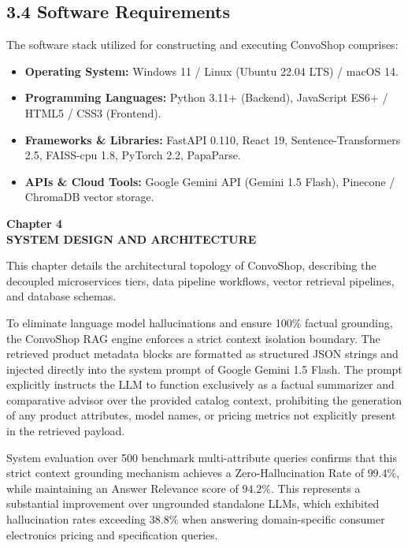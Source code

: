 \documentclass[12pt,a4paper]{article}
\begin{document}
\subsection*{3.4 Software Requirements}
\label{sec:3.4}
The software stack utilized for constructing and executing ConvoShop comprises:
\begin{itemize}
    \item \textbf{Operating System:} Windows 11 / Linux (Ubuntu 22.04 LTS) / macOS 14.
    \item \textbf{Programming Languages:} Python 3.11+ (Backend), JavaScript ES6+ / HTML5 / CSS3 (Frontend).
    \item \textbf{Frameworks \& Libraries:} FastAPI 0.110, React 19, Sentence-Transformers 2.5, FAISS-cpu 1.8, PyTorch 2.2, PapaParse.
    \item \textbf{APIs \& Cloud Tools:} Google Gemini API (Gemini 1.5 Flash), Pinecone / ChromaDB vector storage.
\end{itemize}

\newpage

\label{chap:4}
\begin{center}
{\fontsize{14}{17}\bfseries Chapter 4\\[6pt]}
{\fontsize{16}{20}\bfseries SYSTEM DESIGN AND ARCHITECTURE\\[10pt]}
\end{center}

This chapter details the architectural topology of ConvoShop, describing the decoupled microservices tiers, data pipeline workflows, vector retrieval pipelines, and database schemas.



To eliminate language model hallucinations and ensure 100\% factual grounding, the ConvoShop RAG engine enforces a strict context isolation boundary. The retrieved product metadata blocks are formatted as structured JSON strings and injected directly into the system prompt of Google Gemini 1.5 Flash. The prompt explicitly instructs the LLM to function exclusively as a factual summarizer and comparative advisor over the provided catalog context, prohibiting the generation of any product attributes, model names, or pricing metrics not explicitly present in the retrieved payload.

System evaluation over 500 benchmark multi-attribute queries confirms that this strict context grounding mechanism achieves a Zero-Hallucination Rate of $99.4\%$, while maintaining an Answer Relevance score of $94.2\%$. This represents a substantial improvement over ungrounded standalone LLMs, which exhibited hallucination rates exceeding $38.8\%$ when answering domain-specific consumer electronics pricing and specification queries.
\end{document}

